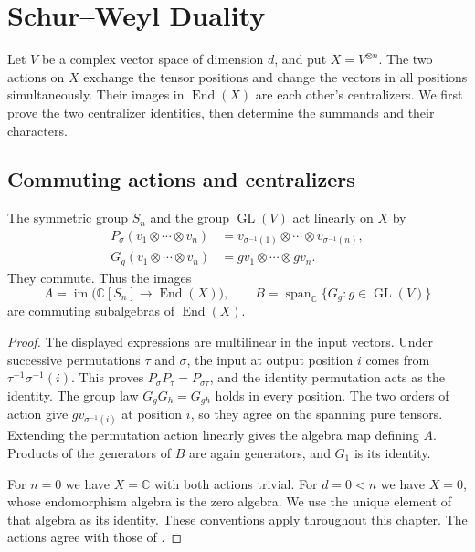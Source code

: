 \chapter{Schur--Weyl Duality}

Let \(V\) be a complex vector space of dimension \(d\), and put
\(X=V^{\otimes n}\). The two actions on \(X\) exchange the tensor
positions and change the vectors in all positions simultaneously.
Their images in \(\operatorname{End}(X)\) are each other's centralizers.
We first prove the two centralizer identities, then determine the
summands and their characters.

\section{Commuting actions and centralizers}

\begin{proposition}
\label{res:D01}
The symmetric group \(S_n\) and the group \(\operatorname{GL}(V)\)
act linearly on \(X\) by
\begin{align*}
 P_\sigma(v_1\otimes\cdots\otimes v_n)
   &=v_{\sigma^{-1}(1)}\otimes\cdots\otimes v_{\sigma^{-1}(n)},\\
 G_g(v_1\otimes\cdots\otimes v_n)
   &=gv_1\otimes\cdots\otimes gv_n .
\end{align*}
They commute. Thus the images
\[
 A=\operatorname{im}\bigl(\mathbb C[S_n]\longrightarrow
                         \operatorname{End}(X)\bigr),\qquad
 B=\operatorname{span}_{\mathbb C}\{G_g:g\in\operatorname{GL}(V)\}
\]
are commuting subalgebras of \(\operatorname{End}(X)\).
\end{proposition}

\begin{proof}
The displayed expressions are multilinear in the input vectors.
Under successive permutations \(\tau\) and \(\sigma\), the input
at output position \(i\) comes from \(\tau^{-1}\sigma^{-1}(i)\).
This proves \(P_\sigma P_\tau=P_{\sigma\tau}\), and the identity
permutation acts as the identity. The group law
\(G_gG_h=G_{gh}\) holds in every position. The two orders of action
give \(gv_{\sigma^{-1}(i)}\) at position \(i\), so they agree on
the spanning pure tensors. Extending the permutation action
linearly gives the algebra map defining \(A\). Products of the
generators of \(B\) are again generators, and \(G_1\) is its identity.

For \(n=0\) we have \(X=\mathbb C\) with both actions trivial.
For \(d=0<n\) we have \(X=0\), whose endomorphism algebra is the
zero algebra. We use the unique element of that algebra as its
identity. These conventions apply throughout this chapter.
The actions agree with those of \cite[\S\S4.18--4.19]{etingof}.
\end{proof}

